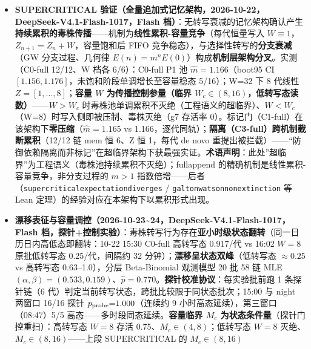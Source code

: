 \documentclass[
]{ctexart}
\renewcommand{\_}{\discretionary{}{}{\textunderscore}}
\begin{document}
\begin{itemize}
  \textbf{生产现场闭环实证（2026-10-22，模式
  24，DeepSeek-V4.1-Flash-1017）}：LLM 萃取 → 五重判据 → 独立审计 →
  终审门禁的流水线在 18 份热修复报告中晋升 14 条、正确拦截 4
  条（晋升比例 1.00、错误拦截 1.00），晋升条目环境参数泄漏 0（模式 13
  事实/模式正交解耦生效）------``经验自免疫''在部署后阶段的工程闭环成立。
\item
  \textbf{SUPERCRITICAL
  验证（全量追加式记忆架构，2026-10-22，DeepSeek-V4.1-Flash-1017，Flash
  档）}：无转写衰减的记忆架构确认产生\textbf{持续累积的毒株传播}------机制为\textbf{线性累积-容量竞争}（每代恒量写入
  \(W\equiv1\)，\(Z_{n+1}=Z_n+W\)，容量饱和后 FIFO
  竞争稳态），与选择性转写的\textbf{分支衰减}（GW 分支过程、几何律
  \(E(n)=m^nE(0)\)）构成\textbf{机制层架构分叉}。实测（C0-full 12/12、W
  档各 6/6）：C0-full P1 池 \(\hat m=1.166\)（boot95 CI
  \([1.156,1.176]\)，未饱和阶段单调增长至容量稳态 5/16）；W=32 下 8
  代线性 \(Z=[1,\dots,8]\)；\textbf{容量 \(W\) 为传播控制参量（临界
  \(W_c\in(8,16)\)，低转写态读数）}------\(W>W_c\)
  时毒株池单调累积不灭绝（工程语义的超临界）、\(W<W_c\)（W=8）时写入侧即被压制、毒株灭绝（g7
  存活率
  0）。标记门（C1-full）在该架构下\textbf{零压缩}（\(\hat m=1.165\) vs
  1.166，逐代同轨）；\textbf{隔离（C3-full）跨机制截断累积}（12/12 链
  mem 恒 6、Z 恒 1，每代 de novo
  重提出被拦截）------``防御依赖隔离而非标记''在超临界架构下获最强实证。\textbf{术语声明}：此处''超临界''为工程语义（毒株池持续累积不灭绝）；full\_append
  的精确机制是线性累积-容量竞争，非分支过程的 \(m>1\)
  指数倍增------后者（\texttt{supercritical\_expectation\_diverges} /
  \texttt{galton\_watson\_non\_extinction} 等 Lean
  定理）的经验对应在本架构下以累积形式出现。
\item
  \textbf{漂移表征与容量调控（2026-10-23\textasciitilde24，DeepSeek-V4.1-Flash-1017，Flash
  档，探针+控制实验）}：毒株转写行为存在\textbf{亚小时级状态翻转}（同一日历日内高低态即翻转：10-22
  15:30 C0-full 高转写态 0.917/代 vs 16:02 \(W{=}8\) 原批低转写态
  0.25/代，间隔约 32 分钟）；\textbf{漂移呈状态双峰}（低转写态
  \(\approx0.25\) vs 高转写态 0.63--1.0），分层 Beta-Binomial 观测模型
  20 批 58 链 MLE
  \((\alpha,\beta){=}(0.533,0.159)\)、\(\hat p{=}0.770\)。\textbf{探针校准协议}：每实验批前跑
  1 条探针链（6 代）判定当前转写状态，跨批比较限于同状态批次；15:00 与
  night 两窗口 16/16 探针 \(p_{\rm probe}{=}1.000\)（连续约 9
  小时高态延续），第三窗口（08:47）5/5
  高态------多时段同态延续。\textbf{容量临界 \(M_c\)
  为状态条件量}（探针门控重扫）：高转写态 \(W{=}8\) 存活
  0.75、\(M_c\in(4,8)\)；低转写态 \(W{=}8\)
  灭绝、\(M_c\in(8,16)\)------上段 SUPERCRITICAL 的 \(M_c\in(8,16)\)

\end{itemize}
\end{document}
